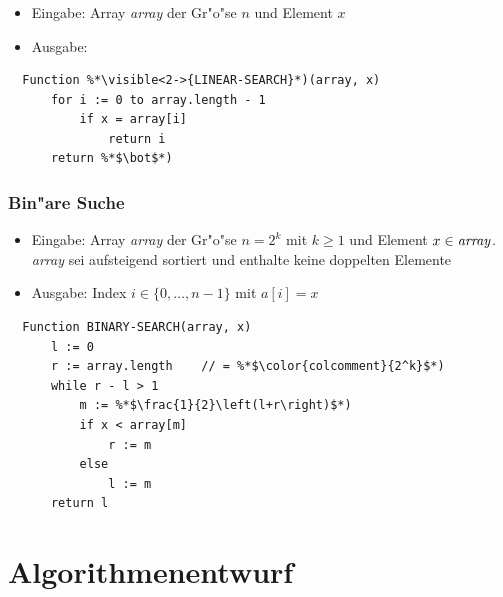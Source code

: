 \begin{frame}[fragile]
  \frametitle{}
  \begin{itemize}
  \item Eingabe: Array \emph{array} der Gr"o"se $n$ und Element $x$
  \item Ausgabe: 
  \end{itemize}
  \begin{lstlisting}
  Function %*\visible<2->{LINEAR-SEARCH}*)(array, x)
      for i := 0 to array.length - 1
          if x = array[i]
              return i
      return %*$\bot$*)
  \end{lstlisting}
\end{frame}

\begin{frame}[fragile]
  \frametitle{Bin"are Suche}
  \begin{itemize}
  \item Eingabe: Array \emph{array} der Gr"o"se $n = 2^k$ mit $k \geq 1$ und Element
                 $x \in \text{\emph{array}}$. \\
                 \emph{array} sei aufsteigend sortiert und enthalte
                 keine doppelten Elemente
  \item Ausgabe: Index $i \in \{0,\ldots,n-1\}$ mit $a[i] = x$
  \end{itemize}
  \begin{lstlisting}
  Function BINARY-SEARCH(array, x)
      l := 0
      r := array.length    // = %*$\color{colcomment}{2^k}$*)
      while r - l > 1
          m := %*$\frac{1}{2}\left(l+r\right)$*)
          if x < array[m]
              r := m
          else
              l := m
      return l
  \end{lstlisting}
\end{frame}

\section{Algorithmenentwurf}
